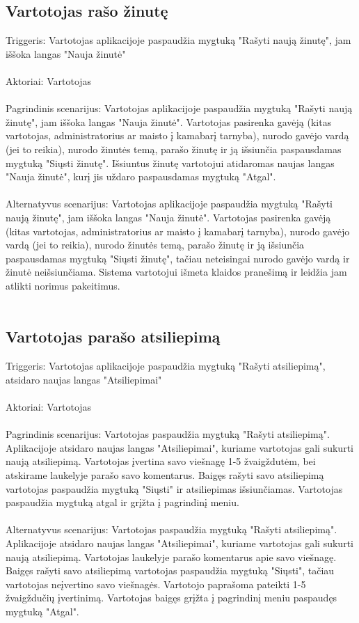 \documentclass[oneside]{VUMIFPSkursinis}
\begin{document}
\subsection{Vartotojas rašo žinutę}
	Triggeris: Vartotojas aplikacijoje paspaudžia mygtuką "Rašyti naują žinutę", jam iššoka langas "Nauja žinutė" \\ \\
	Aktoriai: Vartotojas \\ \\
	Pagrindinis scenarijus: Vartotojas aplikacijoje paspaudžia mygtuką "Rašyti naują žinutę", jam iššoka langas "Nauja žinutė". Vartotojas pasirenka gavėją (kitas vartotojas, administratorius ar maisto į kamabarį tarnyba), nurodo gavėjo vardą (jei to reikia), nurodo žinutės temą, parašo žinutę ir ją išsiunčia paspausdamas mygtuką "Siųsti žinutę". Išsiuntus žinutę vartotojui atidaromas naujas langas "Nauja žinutė", kurį jis uždaro paspausdamas mygtuką "Atgal". \\ \\
	Alternatyvus scenarijus: Vartotojas aplikacijoje paspaudžia mygtuką "Rašyti naują žinutę", jam iššoka langas "Nauja žinutė". Vartotojas pasirenka gavėją (kitas vartotojas, administratorius ar maisto į kamabarį tarnyba), nurodo gavėjo vardą (jei to reikia), nurodo žinutės temą, parašo žinutę ir ją išsiunčia paspausdamas mygtuką "Siųsti žinutę", tačiau neteisingai nurodo gavėjo vardą ir žinutė neišsiunčiama. Sistema vartotojui išmeta klaidos pranešimą ir leidžia jam atlikti norimus pakeitimus. \\ \\

\subsection{Vartotojas parašo atsiliepimą}
	Triggeris: Vartotojas aplikacijoje paspaudžia mygtuką "Rašyti atsiliepimą", atsidaro naujas langas "Atsiliepimai" \\ \\
	Aktoriai: Vartotojas \\ \\
	Pagrindinis scenarijus: Vartotojas paspaudžia mygtuką "Rašyti atsiliepimą". Aplikacijoje atsidaro naujas langas "Atsiliepimai", kuriame vartotojas gali sukurti naują atsiliepimą. Vartotojas įvertina savo viešnagę 1-5 žvaigždutėm, bei atskirame laukelyje parašo savo komentarus. Baigęs rašyti savo atsiliepimą vartotojas paspaudžia mygtuką "Siųsti" ir atsiliepimas išsiunčiamas. Vartotojas paspaudžia mygtuką atgal ir grįžta į pagrindinį meniu. \\ \\
	Alternatyvus scenarijus: Vartotojas paspaudžia mygtuką "Rašyti atsiliepimą". Aplikacijoje atsidaro naujas langas "Atsiliepimai", kuriame vartotojas gali sukurti naują atsiliepimą. Vartotojas laukelyje parašo komentarus apie savo viešnagę. Baigęs rašyti savo atsiliepimą vartotojas paspaudžia mygtuką "Siųsti", tačiau vartotojas neįvertino savo viešnagės. Vartotojo paprašoma pateikti 1-5 žvaigždučių įvertinimą. Vartotojas baigęs grįžta į pagrindinį meniu paspaudęs mygtuką "Atgal". \\ \\
\end{document}
